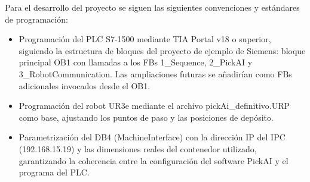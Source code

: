 Para el desarrollo del proyecto se siguen las siguientes convenciones y estándares de programación:
\begin{itemize}
	\item Programación del PLC S7-1500 mediante TIA Portal v18 o superior, siguiendo la estructura de bloques del proyecto de ejemplo de Siemens: bloque principal OB1 con llamadas a los FBs 1\_Sequence, 2\_PickAI y 3\_RobotCommunication. Las ampliaciones futuras se añadirían como FBs adicionales invocados desde el OB1.

	\item Programación del robot UR3e mediante el archivo pickAi\_definitivo.URP como base, ajustando los puntos de paso y las posiciones de depósito.

	\item Parametrización del DB4 (MachineInterface) con la dirección IP del IPC (192.168.15.19) y las dimensiones reales del contenedor utilizado, garantizando la coherencia entre la configuración del software PickAI y el programa del PLC.
\end{itemize}
